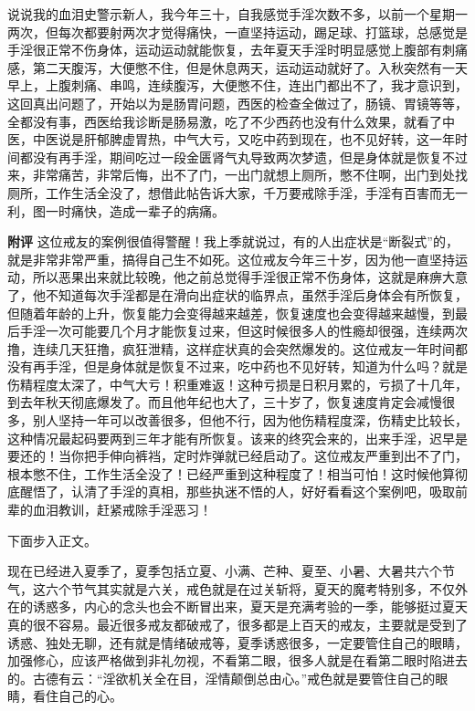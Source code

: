 \begin{case}
    说说我的血泪史警示新人，我今年三十，自我感觉手淫次数不多，以前一个星期一两次，但每次都要射两次才觉得痛快，一直坚持运动，踢足球、打篮球，总感觉是手淫很正常不伤身体，运动运动就能恢复，去年夏天手淫时明显感觉上腹部有刺痛感，第二天腹泻，大便憋不住，但是休息两天，运动运动就好了。入秋突然有一天早上，上腹刺痛、串鸣，连续腹泻，大便憋不住，连出门都出不了，我才意识到，这回真出问题了，开始以为是肠胃问题，西医的检查全做过了，肠镜、胃镜等等，全都没有事，西医给我诊断是肠易激，吃了不少西药也没有什么效果，就看了中医，中医说是肝郁脾虚胃热，中气大亏，又吃中药到现在，也不见好转，这一年时间都没有再手淫，期间吃过一段金匮肾气丸导致两次梦遗，但是身体就是恢复不过来，非常痛苦，非常后悔，出不了门，一出门就想上厕所，憋不住啊，出门到处找厕所，工作生活全没了，想借此帖告诉大家，千万要戒除手淫，手淫有百害而无一利，图一时痛快，造成一辈子的病痛。

    \textbf{附评} 这位戒友的案例很值得警醒！我上季就说过，有的人出症状是“断裂式”的，就是非常非常严重，搞得自己生不如死。这位戒友今年三十岁，因为他一直坚持运动，所以恶果出来就比较晚，他之前总觉得手淫很正常不伤身体，这就是麻痹大意了，他不知道每次手淫都是在滑向出症状的临界点，虽然手淫后身体会有所恢复，但随着年龄的上升，恢复能力会变得越来越差，恢复速度也会变得越来越慢，到最后手淫一次可能要几个月才能恢复过来，但这时候很多人的性瘾却很强，连续两次撸，连续几天狂撸，疯狂泄精，这样症状真的会突然爆发的。这位戒友一年时间都没有再手淫，但是身体就是恢复不过来，吃中药也不见好转，知道为什么吗？就是伤精程度太深了，中气大亏！积重难返！这种亏损是日积月累的，亏损了十几年，到去年秋天彻底爆发了。而且他年纪也大了，三十岁了，恢复速度肯定会减慢很多，别人坚持一年可以改善很多，但他不行，因为他伤精程度深，伤精史比较长，这种情况最起码要两到三年才能有所恢复。该来的终究会来的，出来手淫，迟早是要还的！当你把手伸向裤裆，定时炸弹就已经启动了。这位戒友严重到出不了门，根本憋不住，工作生活全没了！已经严重到这种程度了！相当可怕！这时候他算彻底醒悟了，认清了手淫的真相，那些执迷不悟的人，好好看看这个案例吧，吸取前辈的血泪教训，赶紧戒除手淫恶习！
\end{case}

下面步入正文。

现在已经进入夏季了，夏季包括立夏、小满、芒种、夏至、小暑、大暑共六个节气，这六个节气其实就是六关，戒色就是在过关斩将，夏天的魔考特别多，不仅外在的诱惑多，内心的念头也会不断冒出来，夏天是充满考验的一季，能够挺过夏天真的很不容易。最近很多戒友都破戒了，很多都是上百天的戒友，主要就是受到了诱惑、独处无聊，还有就是情绪破戒等，夏季诱惑很多，一定要管住自己的眼睛，加强修心，应该严格做到非礼勿视，不看第二眼，很多人就是在看第二眼时陷进去的。古德有云：“淫欲机关全在目，淫情颠倒总由心。”戒色就是要管住自己的眼睛，看住自己的心。

